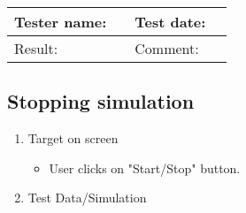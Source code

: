 

\begin{tabularx}{\textwidth}{|p{3cm}X|p{3cm}X|}\hline
	Tester name: &  & Test date: & \\\hline
	Result: &   \pass & Comment: & \\\hline
\end{tabularx}

\newpage

\subsection{Stopping  simulation}

\begin{enumerate}

	\item Target on screen
	\begin{itemize}
		\item User clicks on "Start/Stop" button.
	\end{itemize}
	\item Test Data/Simulation
\end{enumerate}

